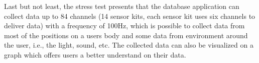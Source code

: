 Last but not least, the stress test presents that the database application can collect data up to 84 channels (14 sensor kits, each sensor kit uses six channels to deliver data) with a frequency of 100Hz, which is possible to collect data from most of the positions on a users body and some data from environment around the user, i.e., the light, sound, etc. The collected data can also be visualized on a graph which offers users a better understand on their data.






